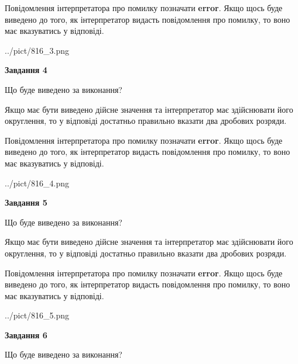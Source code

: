 \documentclass[12pt, ukrainian]{article}
\begin{document}
{\begin {Large}
Повідомлення інтерпретатора про помилку позначати \textbf{error}.
Якщо щось буде виведено до того, як інтерпретатор видасть повідомлення про помилку, 
то воно має вказуватись у відповіді. \par

\begin{center}
	{../pict/816_3.png}
\end{center}
\newpage

{\begin {center}\textbf{Завдання 4}\end {center}}\par
Що буде виведено за виконання? \par

Якщо має бути виведено дійсне значення та інтерпретатор має здійснювати його округлення, 
то у відповіді достатньо правильно вказати два дробових розряди.

Повідомлення інтерпретатора про помилку позначати \textbf{error}.
Якщо щось буде виведено до того, як інтерпретатор видасть повідомлення про помилку, 
то воно має вказуватись у відповіді. \par

\begin{center}
	{../pict/816_4.png}
\end{center}
\newpage

{\begin {center}\textbf{Завдання 5}\end {center}}\par
Що буде виведено за виконання? \par

Якщо має бути виведено дійсне значення та інтерпретатор має здійснювати його округлення, 
то у відповіді достатньо правильно вказати два дробових розряди.

Повідомлення інтерпретатора про помилку позначати \textbf{error}.
Якщо щось буде виведено до того, як інтерпретатор видасть повідомлення про помилку, 
то воно має вказуватись у відповіді. \par

\begin{center}
	{../pict/816_5.png}
\end{center}
\newpage

{\begin {center}\textbf{Завдання 6}\end {center}}\par
Що буде виведено за виконання? \par


\end{Large}}
\end{document}

